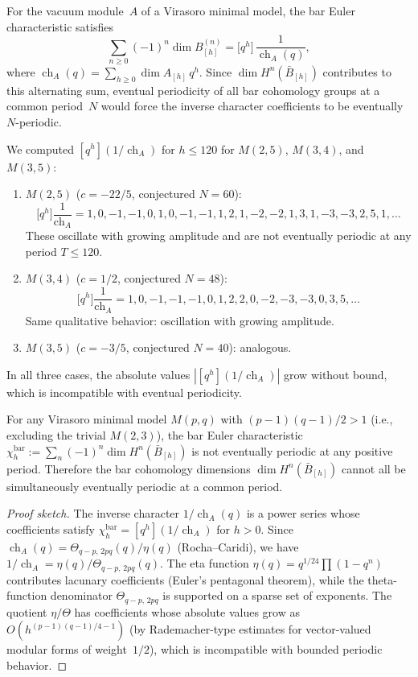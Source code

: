 \documentclass[11pt]{article}
\begin{document}
For the vacuum module~$A$ of a Virasoro minimal model, the bar
Euler characteristic satisfies
\[
\sum_{n \ge 0} (-1)^n \dim B^{(n)}_{[h]}
= \bigl[q^h\bigr]\, \frac{1}{\operatorname{ch}_A(q)},
\]
where $\operatorname{ch}_A(q) = \sum_{h \ge 0} \dim A_{[h]}\, q^h$.
Since $\dim H^n(\bar{B}_{[h]})$ contributes to this alternating
sum, eventual periodicity of all bar cohomology groups at a
common period~$N$ would force the inverse character coefficients
to be eventually $N$-periodic.

\begin{computation}
\label{comp:inverse-character}
We computed $[q^h](1/\operatorname{ch}_A)$ for $h \le 120$ for
$M(2,5)$, $M(3,4)$, and $M(3,5)$:
\begin{enumerate}[label=\textup{(\roman*)}]
\item $M(2,5)$ ($c = -22/5$, conjectured $N = 60$):
\[
\bigl[q^h\bigr]\frac{1}{\operatorname{ch}_A}
= 1, 0, -1, -1, 0, 1, 0, -1, -1, 1, 2, 1, -2, -2, 1,
  3, 1, -3, -3, 2, 5, 1, \ldots
\]
These oscillate with growing amplitude and are not eventually
periodic at any period $T \le 120$.
\item $M(3,4)$ ($c = 1/2$, conjectured $N = 48$):
\[
\bigl[q^h\bigr]\frac{1}{\operatorname{ch}_A}
= 1, 0, -1, -1, -1, 0, 1, 2, 2, 0, -2, -3, -3, 0, 3, 5, \ldots
\]
Same qualitative behavior: oscillation with growing amplitude.
\item $M(3,5)$ ($c = -3/5$, conjectured $N = 40$): analogous.
\end{enumerate}
In all three cases, the absolute values
$|[q^h](1/\operatorname{ch}_A)|$ grow without bound, which is
incompatible with eventual periodicity.
\end{computation}

\begin{proposition}
\label{prop:bar-periodicity-fails}
For any Virasoro minimal model $M(p,q)$ with
$(p-1)(q-1)/2 > 1$ (i.e., excluding the trivial $M(2,3)$),
the bar Euler characteristic
$\chi^{\operatorname{bar}}_h := \sum_n (-1)^n \dim H^n(\bar{B}_{[h]})$
is not eventually periodic at any positive period.
Therefore the bar cohomology dimensions
$\dim H^n(\bar{B}_{[h]})$ cannot all be simultaneously
eventually periodic at a common period.
\end{proposition}

\begin{proof}[Proof sketch]
The inverse character $1/\operatorname{ch}_A(q)$ is a power series
whose coefficients satisfy
$\chi^{\operatorname{bar}}_h = [q^h](1/\operatorname{ch}_A)$ for $h > 0$.
Since $\operatorname{ch}_A(q) = \Theta_{q-p,\,2pq}(q)/\eta(q)$
(Rocha--Caridi), we have
$1/\operatorname{ch}_A = \eta(q)/\Theta_{q-p,\,2pq}(q)$.
The eta function $\eta(q) = q^{1/24}\prod(1-q^n)$ contributes
lacunary coefficients (Euler's pentagonal theorem), while the
theta-function denominator $\Theta_{q-p,\,2pq}$ is supported
on a sparse set of exponents.  The quotient $\eta/\Theta$ has
coefficients whose absolute values grow as
$O(h^{(p-1)(q-1)/4 - 1})$ (by Rademacher-type estimates for
vector-valued modular forms of weight~$1/2$), which is
incompatible with bounded periodic behavior.
\end{proof}
\end{document}
